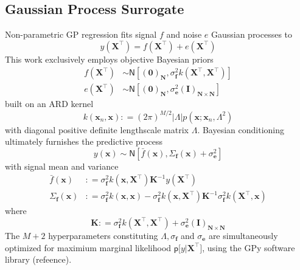\documentclass[preprint,12pt]{elsarticle}
\newcommand*{\M}[1]{\ensuremath{#1}\xspace}
\newcommand*{\vr}[1]{\M{\mathbf{#1}}}
\newcommand*{\deq}{\M{\mathrel{\mathop:}=}}
\newcommand*{\gauss}[2]{\mathsf{N}\!\left\lbrack{} #1 , #2 \right\rbrack}
\newcommand*{\modulus}[1]{\M{\left\lvert#1\right\rvert}}
\begin{document}
        \subsection{Gaussian Process Surrogate} \label{sub:Method:GP}
            Non-parametric GP regression fits signal $f$ and noise $e$ Gaussian processes to
            \begin{equation} \label{eq:Method:GP:Problem}
                y(\vr{X}^{\intercal}) = f(\vr{X}^{\intercal}) + e(\vr{X}^{\intercal})
            \end{equation}
            This work exclusively employs objective Bayesian priors
            \begin{align*}
                f(\vr{X}^{\intercal}) &\sim \gauss{(\vr{0})_{\vr{N}}}{\sigma_{\vr{f}}^{2} k(\vr{X}^{\intercal},\vr{X}^{\intercal})} \\
                e(\vr{X}^{\intercal}) &\sim \gauss{(\vr{0})_{\vr{N}}}{\sigma_{\vr{e}}^{2} (\vr{I})_{\vr{N}\times\vr{N}}} 
            \end{align*}
            built on an ARD kernel \cite{Wipf.Nagarajan2007, Neal1996}
            \begin{equation} \label{eq:Method:GP:Kernel}
                k(\vr{x}_{n},\vr{x}) \deq 
                (2 \pi)^{M/2} \modulus{\Lambda} p\!\left(\vr{x} ; \vr{x}_{n}, \Lambda^2\right) 
            \end{equation}
            with diagonal positive definite lengthscale matrix \(\Lambda\).
            Bayesian conditioning ultimately furnishes the predictive process
            \begin{equation*}
                y(\vr{x}) \sim \gauss{\bar{f}(\vr{x})}{\Sigma_{\vr{f}}(\vr{x}) + \sigma_{\vr{e}}^{2}}
            \end{equation*}
            with signal mean and variance
            \begin{equation} \label{eq:Method:GP:MeanAndVariance}
                \begin{aligned}
                    \bar{f}(\vr{x}) &\deq \sigma^{2}_\vr{f} k(\vr{x},\vr{X}^{\intercal})
                    \vr{K}^{-1} y(\vr{X}^{\intercal}) \\
                    \Sigma_{\vr{f}}(\vr{x}) &\deq \sigma^{2}_\vr{f} k(\vr{x},\vr{x})
                    - \sigma^{2}_\vr{f} k(\vr{x},\vr{X}^{\intercal})
                    \vr{K}^{-1} \sigma^{2}_\vr{f} k(\vr{X}^{\intercal},\vr{x})
                \end{aligned}
            \end{equation}
        where
            \begin{equation} \label{eq:Method:GP:KDef}
                \vr{K} \deq \sigma^{2}_\vr{f} k(\vr{X}^{\intercal},\vr{X}^{\intercal}) + \sigma_{\vr{e}}^{2} (\vr{I})_{\vr{N}\times\vr{N}}       
            \end{equation}
        The $M+2$ hyperparameters constituting $\Lambda, \sigma_{\vr{f}}$ and $\sigma_{\vr{e}}$ are simultaneously optimized for maximium marginal likelihood $\mathsf{p}\lbrack y \vert \vr{X}^{\intercal}\rbrack$, using the GPy software library (refeence).
\end{document}
